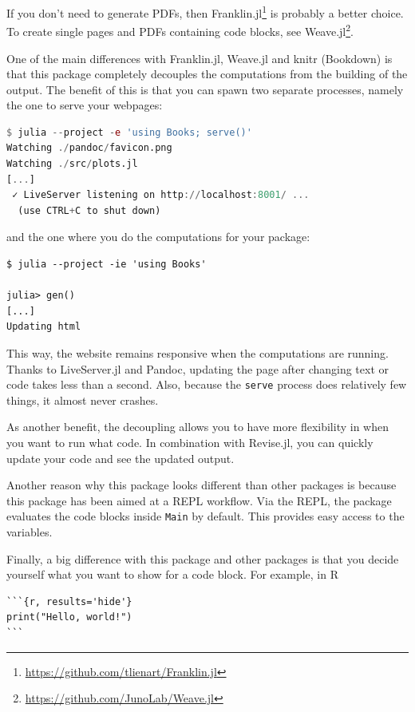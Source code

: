 \documentclass[
  notoc %
]{tufte-book}
\DeclareRobustCommand{\href}[2]{#2\footnote{\url{#1}}}
\newcommand{\passthrough}[1]{#1}
\begin{document}
If you don't need to generate PDFs, then
\href{https://github.com/tlienart/Franklin.jl}{Franklin.jl} is probably
a better choice. To create single pages and PDFs containing code blocks,
see \href{https://github.com/JunoLab/Weave.jl}{Weave.jl}.

One of the main differences with Franklin.jl, Weave.jl and knitr
(Bookdown) is that this package completely decouples the computations
from the building of the output. The benefit of this is that you can
spawn two separate processes, namely the one to serve your webpages:

\begin{lstlisting}[language=Julia]
$ julia --project -e 'using Books; serve()'
Watching ./pandoc/favicon.png
Watching ./src/plots.jl
[...]
 ✓ LiveServer listening on http://localhost:8001/ ...
  (use CTRL+C to shut down)

\end{lstlisting}

and the one where you do the computations for your package:

\begin{lstlisting}
$ julia --project -ie 'using Books'

julia> gen()
[...]
Updating html
\end{lstlisting}

This way, the website remains responsive when the computations are
running. Thanks to LiveServer.jl and Pandoc, updating the page after
changing text or code takes less than a second. Also, because the
\passthrough{\lstinline!serve!} process does relatively few things, it
almost never crashes.

As another benefit, the decoupling allows you to have more flexibility
in when you want to run what code. In combination with Revise.jl, you
can quickly update your code and see the updated output.

Another reason why this package looks different than other packages is
because this package has been aimed at a REPL workflow. Via the REPL,
the package evaluates the code blocks inside
\passthrough{\lstinline!Main!} by default. This provides easy access to
the variables.

Finally, a big difference with this package and other packages is that
you decide yourself what you want to show for a code block. For example,
in R

\begin{lstlisting}
```{r, results='hide'}
print("Hello, world!")
```
\end{lstlisting}
\end{document}
